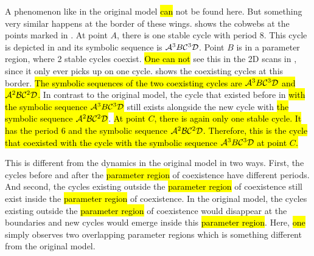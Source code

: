 A phenomenon like in the original model \hl{can} not be found here.
But something very similar happens at the border of these wings.
 shows the cobwebs at the points marked in .
At point $A$, there is one stable cycle with period $8$.
This cycle is depicted in  and its symbolic sequence is $\mathcal{A}^3B\mathcal{C}^3\mathcal{D}$.
Point $B$ is in a parameter region, where 2 stable cycles coexist.
\hl{One can not} see this in the 2D scans in , since it only ever picks up on one cycle.
 shows the coexisting cycles at this border.
\hl{
	The symbolic sequences of the two coexisting cycles are $\mathcal{A}^3B\mathcal{C}^3\mathcal{D}$ and $\mathcal{A}^2\mathcal{B}\mathcal{C}^2\mathcal{D}$.
}
In contrast to the original model, the cycle that existed before in  \hl{with the symbolic sequence $\mathcal{A}^3B\mathcal{C}^3\mathcal{D}$} still exists alongside the new cycle with \hl{the symbolic sequence $\mathcal{A}^2\mathcal{B}\mathcal{C}^2\mathcal{D}$}.
\hl{
	At point $C$, there is again only one stable cycle.
	It has the period $6$ and the symbolic sequence $\mathcal{A}^2\mathcal{B}\mathcal{C}^2\mathcal{D}$.
	Therefore, this is the cycle that coexisted with the cycle with the symbolic sequence $\mathcal{A}^3B\mathcal{C}^3\mathcal{D}$ at point $C$.
}

This is different from the dynamics in the original model in two ways.
First, the cycles before and after the \hl{parameter region} of coexistence have different periods.
And second, the cycles existing outside the \hl{parameter region} of coexistence still exist inside the \hl{parameter region} of coexistence.
In the original model, the cycles existing outside the \hl{parameter region} of coexistence would disappear at the boundaries and new cycles would emerge inside this \hl{parameter region}.
Here, \hl{one} simply observes two overlapping parameter regions which is something different from the original model.
